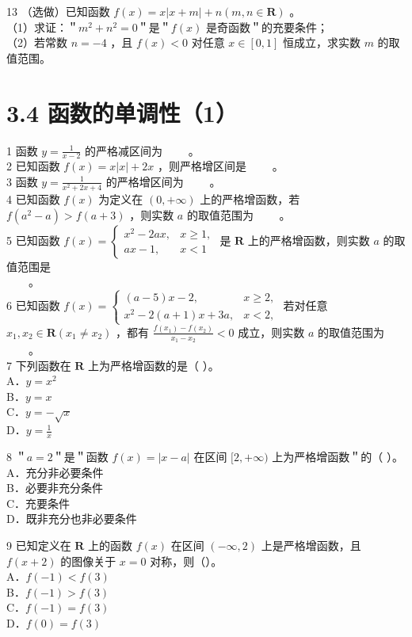 \documentclass[10pt]{article}
\begin{document}
13 （选做）已知函数 \(f(x)=x|x+m|+n(m, n \in \mathbf{R})\) 。\\
（1）求证：＂\(m^{2}+n^{2}=0\)＂是＂\(f(x)\) 是奇函数＂的充要条件；\\
（2）若常数 \(n=-4\) ，且 \(f(x)<0\) 对任意 \(x \in[0,1]\) 恒成立，求实数 \(m\) 的取值范围。

\section*{3.4 函数的单调性（1）}
1 函数 \(y=\frac{1}{x-2}\) 的严格减区间为 \(\qquad\)。\\
2 已知函数 \(f(x)=x|x|+2 x\) ，则严格增区间是 \(\qquad\)。\\
3 函数 \(y=\frac{1}{x^{2}+2 x+4}\) 的严格增区间为 \(\qquad\)。\\
4 已知函数 \(f(x)\) 为定义在 \((0,+\infty)\) 上的严格增函数，若 \(f\left(a^{2}-a\right)>f(a+3)\) ，则实数 \(a\) 的取值范围为 \(\qquad\)。\\
5 已知函数 \(f(x)=\left\{\begin{array}{ll}x^{2}-2 a x, & x \geqslant 1, \\ a x-1, & x<1\end{array}\right.\) 是 \(\mathbf{R}\) 上的严格增函数，则实数 \(a\) 的取值范围是\\
\(\qquad\)。\\
6 已知函数 \(f(x)=\left\{\begin{array}{ll}(a-5) x-2, & x \geqslant 2, \\ x^{2}-2(a+1) x+3 a, & x<2,\end{array}\right.\) 若对任意 \(x_{1}, x_{2} \in \mathbf{R}\left(x_{1} \neq x_{2}\right)\) ，都有 \(\frac{f\left(x_{1}\right)-f\left(x_{2}\right)}{x_{1}-x_{2}}<0\) 成立，则实数 \(a\) 的取值范围为 \(\qquad\)。\\
7 下列函数在 \(\mathbf{R}\) 上为严格增函数的是（ ）。\\
A．\(y=x^{2}\)\\
B．\(y=x\)\\
C．\(y=-\sqrt{x}\)\\
D．\(y=\frac{1}{x}\)

8 ＂\(a=2\)＂是＂函数 \(f(x)=|x-a|\) 在区间 \([2,+\infty)\) 上为严格增函数＂的（ ）。\\
A．充分非必要条件\\
B．必要非充分条件\\
C．充要条件\\
D．既非充分也非必要条件

9 已知定义在 \(\mathbf{R}\) 上的函数 \(f(x)\) 在区间 \((-\infty, 2)\) 上是严格增函数，且 \(f(x+2)\) 的图像关于 \(x=0\) 对称，则（）。\\
A．\(f(-1)<f(3)\)\\
B．\(f(-1)>f(3)\)\\
C．\(f(-1)=f(3)\)\\
D．\(f(0)=f(3)\)
\end{document}
